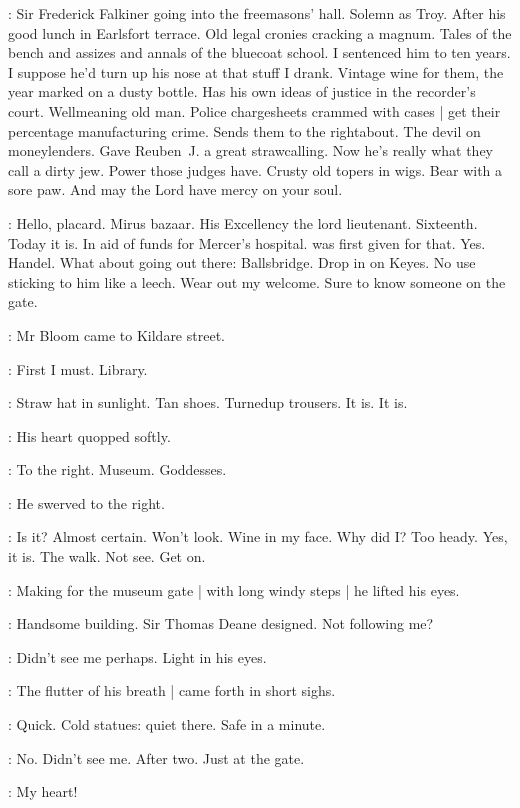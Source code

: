 \BloomInt:
Sir Frederick Falkiner going into the freemasons' hall.
Solemn as Troy.
After his good lunch in Earlsfort terrace.
Old legal cronies cracking a magnum.
Tales of the bench and assizes and annals of the bluecoat school.
I sentenced him to ten years.
I suppose he'd turn up his nose at that stuff I drank.
Vintage wine for them,
the year marked on a dusty bottle.
Has his own ideas of justice in the recorder's court.
Wellmeaning old man.
Police chargesheets crammed with cases |
get their percentage manufacturing crime.
Sends them to the rightabout.
The devil on moneylenders.
Gave Reuben~J. a great strawcalling.
Now he's really what they call a dirty jew.
Power those judges have.
Crusty old topers in wigs.
Bear with a sore paw.
And may the Lord have mercy on your soul.

\BloomInt:
Hello, placard.
Mirus bazaar.
His Excellency the lord lieutenant.
Sixteenth.
Today it is.
In aid of funds for Mercer's hospital.
 was first given for that.
Yes.
Handel.
What about going out there:
Ballsbridge.
Drop in on Keyes.
No use sticking to him like a leech.
Wear out my welcome.
Sure to know someone on the gate.

:
Mr Bloom came to Kildare street.

\BloomInt:
First I must.
Library.

\BloomInt:
Straw hat in sunlight.
Tan shoes.
Turnedup trousers.
It is.
It is.

:
His heart quopped softly.

\BloomInt:
To the right.
Museum.
Goddesses.

:
He swerved to the right.%

\BloomInt:
Is it?
Almost certain.
Won't look.
Wine in my face.
Why did I?
Too heady.
Yes,
it is.
The walk.
Not see.
Get on.

:
Making for the museum gate |
with long windy steps |
he lifted his eyes.

\BloomInt:
Handsome building.
Sir Thomas Deane designed.
Not following me?

\BloomInt:
Didn't see me perhaps.
Light in his eyes.

:
The flutter of his breath |
came forth in short sighs.

\BloomInt:
Quick.
Cold statues:
quiet there.
Safe in a minute.

\BloomInt:
No.
Didn't see me.
After two.
Just at the gate.

\BloomInt:
My heart!

